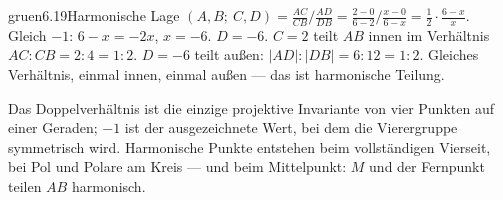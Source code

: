 \begin{loesungkarte}{gruen}{6.19}{Harmonische Lage}
$(A, B;\ C, D) = \frac{AC}{CB}\Big/\frac{AD}{DB} = \frac{2 - 0}{6 - 2}\Big/\frac{x - 0}{6 - x} = \frac12\cdot\frac{6 - x}x$. Gleich $-1$: $6 - x = -2x$, $x = -6$. $D = -6$.
$C = 2$ teilt $AB$ innen im Verhältnis $AC : CB = 2 : 4 = 1 : 2$. $D = -6$ teilt außen: $|AD| : |DB| = 6 : 12 = 1 : 2$. Gleiches Verhältnis, einmal innen, einmal außen --- das ist harmonische Teilung.
\begin{mitnehmen}\kastentext
Das Doppelverhältnis ist die einzige projektive Invariante von vier Punkten auf einer Geraden; $-1$ ist der ausgezeichnete Wert, bei dem die Vierergruppe symmetrisch wird. Harmonische Punkte entstehen beim vollständigen Vierseit, bei Pol und Polare am Kreis --- und beim Mittelpunkt: $M$ und der Fernpunkt teilen $AB$ harmonisch.
\end{mitnehmen}
\end{loesungkarte}

